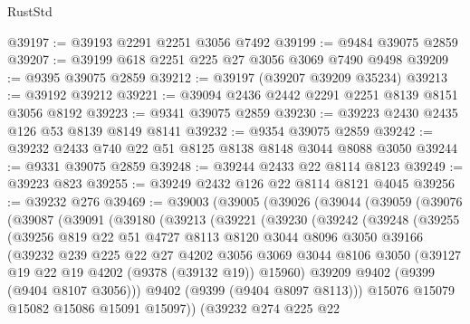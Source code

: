 \begin{lexlean}{RustStd}
\begin{coremodule}
@39197 := @39193 @2291 @2251 @3056 @7492
@39199 := @9484 @39075 @2859
@39207 := @39199 @618 @2251 @225 @27 @3056 @3069 @7490 @9498
@39209 := @9395 @39075 @2859
@39212 := @39197 (@39207 @39209 @35234)
@39213 := @39192 @39212
@39221 := @39094 @2436 @2442 @2291 @2251 @8139 @8151 @3056 @8192
@39223 := @9341 @39075 @2859
@39230 := @39223 @2430 @2435 @126 @53 @8139 @8149 @8141
@39232 := @9354 @39075 @2859
@39242 := @39232 @2433 @740 @22 @51 @8125 @8138 @8148 @3044 @8088 @3050
@39244 := @9331 @39075 @2859
@39248 := @39244 @2433 @22 @8114 @8123
@39249 := @39223 @823
@39255 := @39249 @2432 @126 @22 @8114 @8121 @4045
@39256 := @39232 @276
@39469 := @39003
    (@39005
      (@39026
        (@39044
          (@39059
            (@39076
              (@39087
                (@39091
                  (@39180
                    (@39213
                      (@39221
                        (@39230
                          (@39242
                            (@39248
                              (@39255
                                (@39256
                                  @819
                                  @22
                                  @51
                                  @4727
                                  @8113
                                  @8120
                                  @3044
                                  @8096
                                  @3050
                                  @39166
                                  (@39232
                                    @239
                                    @225
                                    @22
                                    @27
                                    @4202
                                    @3056
                                    @3069
                                    @3044
                                    @8106
                                    @3050
                                    (@39127 @19 @22 @19 @4202 (@9378 (@39132 @19)) @15960)
                                    @39209
                                    @9402
                                    (@9399 (@9404 @8107 @3056)))
                                  @9402
                                  (@9399 (@9404 @8097 @8113)))
                                @15076
                                @15079
                                @15082
                                @15086
                                @15091
                                @15097))
                            (@39232
                              @274
                              @225
                              @22

\end{coremodule}
\end{lexlean}
